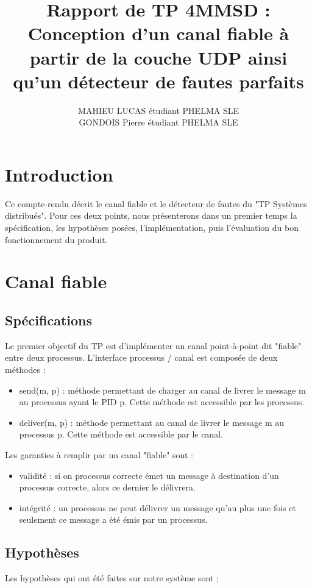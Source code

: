 \documentclass[a4paper, 10pt, french]{article}
\title{Rapport de TP 4MMSD : Conception d'un canal fiable à partir de la couche UDP ainsi qu'un détecteur de fautes parfaits}
\author{ MAHIEU LUCAS étudiant PHELMA SLE 
\\ GONDOIS Pierre étudiant PHELMA SLE
}
\begin{document}
\maketitle

\section{Introduction}
Ce compte-rendu décrit le canal fiable et le détecteur de fautes du "TP Systèmes distribués". Pour ces deux points, nous présenterons dans un premier temps la spécification, les hypothèses posées, l'implémentation, puis l'évaluation du bon fonctionnement du produit.

\section{Canal fiable}

\subsection{Spécifications}
Le premier objectif du TP est d'implémenter un canal point-à-point dit "fiable" entre deux processus. L'interface processus / canal est composée de deux méthodes :

\begin{itemize}
	\item send(m, p) : méthode permettant de charger au canal de livrer le message m au processus ayant le PID p. Cette méthode est accessible par les processus.
	\item deliver(m, p) : méthode permettant au canal de livrer le message m au processus p. Cette méthode est accessible par le canal.\newline
\end{itemize}
	
	Les garanties à remplir par un canal "fiable" sont :
\begin{itemize}
	\item validité : si on processus correcte émet un message à destination d'un processus correcte, alors ce dernier le délivrera.
	\item intégrité : un processus ne peut délivrer un message qu'au plus une fois et seulement ce message a été émis par un processus.
\end{itemize}

\subsection{Hypothèses}
Les hypothèses qui ont été faites sur notre système sont ; 
\end{document}
